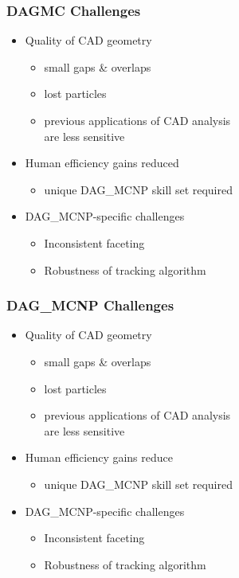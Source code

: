 \documentclass[14pt]{beamer}
\begin{document}
\begin{frame}
\frametitle{DAGMC Challenges}
\begin{itemize}
\vfill
\item Quality of CAD geometry
	\begin{itemize}
	\item small gaps \& overlaps
	\item lost particles
	\item previous applications of CAD analysis \\
	are less sensitive
	\end{itemize}
\vfill
\item Human efficiency gains reduced
	\begin{itemize}
	\item unique DAG\_MCNP skill set required
	\end{itemize}
\vfill
\item DAG\_MCNP-specific challenges
	\begin{itemize}
	\item Inconsistent faceting
	\item Robustness of tracking algorithm
	\end{itemize}
\end{itemize}
\end{frame}

\begin{frame}
\frametitle{DAG\_MCNP Challenges}
\begin{itemize}
\vfill

\item Quality of CAD geometry
	\begin{itemize}
	\color{red}
	\item small gaps \& overlaps
	\item lost particles
	\item previous applications of CAD analysis \\
	are less sensitive
	\end{itemize}
\vfill
\item Human efficiency gains reduce
	\begin{itemize}
	\item unique DAG\_MCNP skill set required
	\end{itemize}
\vfill
\item DAG\_MCNP-specific challenges
	\begin{itemize}
	\item Inconsistent faceting
	\item Robustness of tracking algorithm
	\end{itemize}
\end{itemize}
\end{frame}
\end{document}
